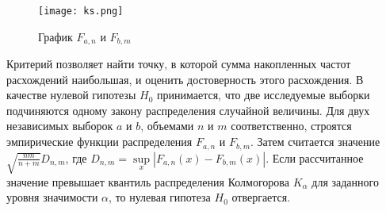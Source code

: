 \begin{figure}
    \centering
    \texttt{[image: ks.png]}
    \caption{График $F_{a, n}$ и $F_{b, m}$}
    \label{ks}
\end{figure}

Критерий позволяет найти точку, в которой сумма накопленных частот расхождений наибольшая, и оценить достоверность этого расхождения. В качестве нулевой гипотезы $H_0$ принимается, что две исследуемые выборки подчиняются одному закону распределения случайной величины. Для двух независимых выборок $a$ и $b$, объемами $n$ и $m$ соответственно, строятся эмпирические функции распределения $F_{a, n}$ и $F_{b, m}$. Затем считается значение $\sqrt{\frac{nm}{n + m}}D_{n, m}$, где $D_{n, m} = \sup\limits_x|F_{a, n}(x) - F_{b, m}(x)|$. Если рассчитанное значение превышает квантиль распределения Колмогорова $K_{\alpha}$ для заданного уровня значимости $\alpha$, то нулевая гипотеза $H_0$ отвергается.




